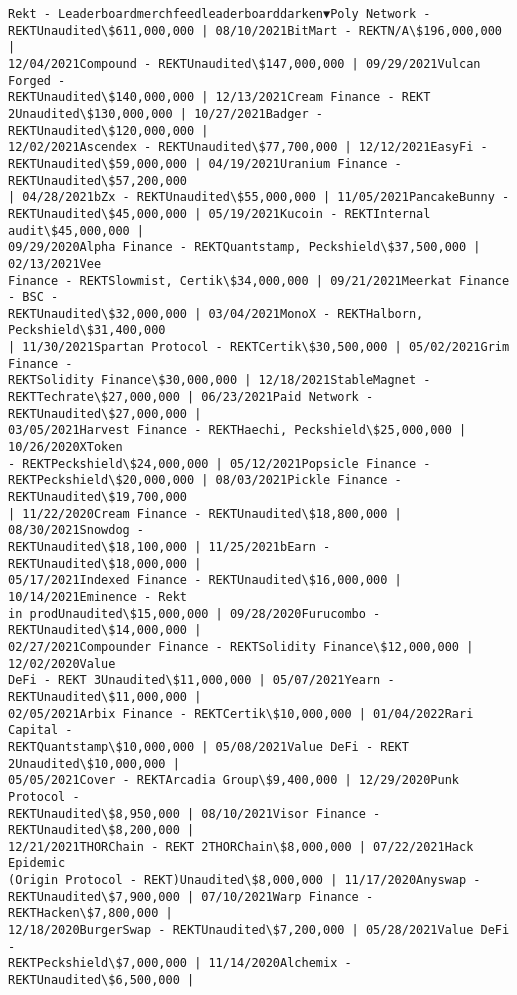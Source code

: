 \documentclass[11pt]{article}
\begin{document}
    \begin{Verbatim}[commandchars=\\\{\}]
Rekt - Leaderboardmerchfeedleaderboarddarken▼Poly Network -
REKTUnaudited\$611,000,000 | 08/10/2021BitMart - REKTN/A\$196,000,000 |
12/04/2021Compound - REKTUnaudited\$147,000,000 | 09/29/2021Vulcan Forged -
REKTUnaudited\$140,000,000 | 12/13/2021Cream Finance - REKT
2Unaudited\$130,000,000 | 10/27/2021Badger - REKTUnaudited\$120,000,000 |
12/02/2021Ascendex - REKTUnaudited\$77,700,000 | 12/12/2021EasyFi -
REKTUnaudited\$59,000,000 | 04/19/2021Uranium Finance - REKTUnaudited\$57,200,000
| 04/28/2021bZx - REKTUnaudited\$55,000,000 | 11/05/2021PancakeBunny -
REKTUnaudited\$45,000,000 | 05/19/2021Kucoin - REKTInternal audit\$45,000,000 |
09/29/2020Alpha Finance - REKTQuantstamp, Peckshield\$37,500,000 | 02/13/2021Vee
Finance - REKTSlowmist, Certik\$34,000,000 | 09/21/2021Meerkat Finance - BSC -
REKTUnaudited\$32,000,000 | 03/04/2021MonoX - REKTHalborn, Peckshield\$31,400,000
| 11/30/2021Spartan Protocol - REKTCertik\$30,500,000 | 05/02/2021Grim Finance -
REKTSolidity Finance\$30,000,000 | 12/18/2021StableMagnet -
REKTTechrate\$27,000,000 | 06/23/2021Paid Network - REKTUnaudited\$27,000,000 |
03/05/2021Harvest Finance - REKTHaechi, Peckshield\$25,000,000 | 10/26/2020XToken
- REKTPeckshield\$24,000,000 | 05/12/2021Popsicle Finance -
REKTPeckshield\$20,000,000 | 08/03/2021Pickle Finance - REKTUnaudited\$19,700,000
| 11/22/2020Cream Finance - REKTUnaudited\$18,800,000 | 08/30/2021Snowdog -
REKTUnaudited\$18,100,000 | 11/25/2021bEarn - REKTUnaudited\$18,000,000 |
05/17/2021Indexed Finance - REKTUnaudited\$16,000,000 | 10/14/2021Eminence - Rekt
in prodUnaudited\$15,000,000 | 09/28/2020Furucombo - REKTUnaudited\$14,000,000 |
02/27/2021Compounder Finance - REKTSolidity Finance\$12,000,000 | 12/02/2020Value
DeFi - REKT 3Unaudited\$11,000,000 | 05/07/2021Yearn - REKTUnaudited\$11,000,000 |
02/05/2021Arbix Finance - REKTCertik\$10,000,000 | 01/04/2022Rari Capital -
REKTQuantstamp\$10,000,000 | 05/08/2021Value DeFi - REKT 2Unaudited\$10,000,000 |
05/05/2021Cover - REKTArcadia Group\$9,400,000 | 12/29/2020Punk Protocol -
REKTUnaudited\$8,950,000 | 08/10/2021Visor Finance - REKTUnaudited\$8,200,000 |
12/21/2021THORChain - REKT 2THORChain\$8,000,000 | 07/22/2021Hack Epidemic
(Origin Protocol - REKT)Unaudited\$8,000,000 | 11/17/2020Anyswap -
REKTUnaudited\$7,900,000 | 07/10/2021Warp Finance - REKTHacken\$7,800,000 |
12/18/2020BurgerSwap - REKTUnaudited\$7,200,000 | 05/28/2021Value DeFi -
REKTPeckshield\$7,000,000 | 11/14/2020Alchemix - REKTUnaudited\$6,500,000 |

\end{Verbatim}
\end{document}
